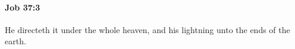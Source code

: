 
		\paragraph{Job 37:3} %
			\label{JOB-37-3}

			He directeth it under the whole heaven, and his lightning unto the ends of the earth.


